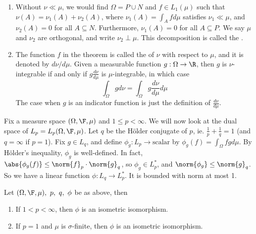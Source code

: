\documentclass[a4paper]{article}
\begin{document}
\begin{remark}
	\begin{enumerate}[label=(\arabic*)]
		\item Without $\nu\ll\mu$, we would find $\Omega=P\cup N$ and $f\in L_1(\mu)$ such that $\nu(A)=\nu_1(A)+\nu_2(A)$, where $\nu_1(A)=\int_A f d\mu$ satisfies $\nu_1\ll\mu$, and $\nu_2(A)=0$ for all $A\subseteq N$. Furthermore, $\nu_1(A)=0$ for all $A\subseteq P$. We say $\mu$ and $\nu_2$ are orthogonal, and write $\nu_2\perp\mu$. This decomposition is called the .
		\item The function $f$ in the theorem is called the  of $\nu$ with respect to $\mu$, and it is denoted by $d\nu/d\mu$. Given a measurable function $g:\Omega\to\R$, then $g$ is $\nu$-integrable if and only if $g\frac{d\nu}{d\mu}$ is $\mu$-integrable, in which case
		\[
		 \int_\Omega g d\nu=\int_\Omega g\frac{d\nu}{d\mu}d\mu
		\]
		The case when $g$ is an indicator function is just the definition of $\frac{d\nu}{d\mu}$.
	\end{enumerate}
\end{remark}

Fix a measure space $(\Omega,\F,\mu)$ and $1\leq p<\infty$. We will now look at the dual space of $L_p=L_p(\Omega,\F,\mu)$. Let $q$ be the H\"older conjugate of $p$, ie. $\frac{1}{p}+\frac{1}{q}=1$ (and $q=\infty$ if $p=1$). Fix $g\in L_q$, and define $\phi_g:L_p\to\text{scalar}$ by $\phi_g(f)=\int_\Omega fg d\mu$. By H\"older's inequality, $\phi_g$ is well-defined. In fact, $\abs{\phi_g(f)}\leq\norm{f}_p\cdot\norm{g}_q$, so $\phi_g\in L_p^*$, and $\norm{\phi_g}\leq\norm{g}_q$. So we have a linear function $\phi:L_q\to L_p^*$. It is bounded with norm at most 1.

\begin{nthm}\label{thm:DualLp}
  Let $(\Omega,\F,\mu),\ p,\ q,\ \phi$ be as above, then
  \begin{enumerate}[label=(\roman*)]
	 \item If $1<p<\infty$, then $\phi$ is an isometric isomorphism.
  	\item If $p=1$ and $\mu$ is $\sigma$-finite, then $\phi$ is an isometric isomorphism.
  \end{enumerate}
\end{nthm}
\end{document}
